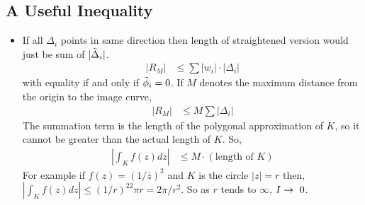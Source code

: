 \documentclass[12pt]{article}
\def\td{\ensuremath\tilde}
\def\rto{\ensuremath\rightarrow\ }
\begin{document}
\subsection{A Useful Inequality}
\begin{itemize}
    \item If all $\Delta_i$ points in same direction then length of straightened version would just be sum of $|\td{\Delta}_i|$.
    \begin{align*}
        |R_M| &\leq \sum |w_i|\cdot |\Delta_i|
    \end{align*}
    with equality if and only if $\td{\phi}_i=0$. If $M$ denotes the maximum distance from the origin to the image curve,
    \begin{align*}
        |R_M| &\leq M \sum |\Delta_i|
    \end{align*}
    The summation term is the length of the polygonal approximation of $K$, so it cannot be greater than the actual length of $K$. So,
    \begin{align*}
        |\int_{K}f(z)dz| &\leq M \cdot (\text{length of }K)
    \end{align*}
    For example if $f(z)=(1/\bar{z})^2$ and $K$ is the circle $|z|=r$ then, $|\int_{K}f(z)dz| \leq (1/r)^22\pi r = 2\pi/r^2$. So as $r$ tends to $\infty$, $I\rto 0$.
\end{itemize}
\end{document}

